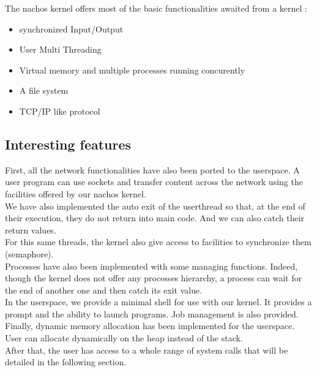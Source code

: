 The nachos kernel offers most of the basic functionalities awaited from a kernel :\\
\begin{itemize}
\item synchronized Input/Output
\item User Multi Threading
\item Virtual memory and multiple processes running concurently
\item A file system
\item TCP/IP like protocol
\end{itemize}

\subsection{Interesting features}

First, all the network functionalities have also been ported to the userspace. A user program can use sockets and 
transfer content across the network using the facilities offered by our nachos kernel. \\
We have also implemented the auto exit of the userthread so that, at the end of their execution, they do not return
into main code. And we can also catch their return values.\\
For this same threads, the kernel also give access to facilities to synchronize them (semaphore).\\
Processes have also been implemented with some managing functions. Indeed, though the kernel does not offer any 
processes hierarchy, a process can wait for the end of another one and then catch its exit value.\\
In the userspace, we provide a minimal shell for use with our kernel. It provides a prompt and the ability
to launch programs. Job management is also provided.\\
Finally, dynamic memory allocation has been implemented for the userspace. User can allocate dynamically on the heap 
instead of the stack.\\
After that, the user has access to a whole range of system calls that will be detailed in the following section.
